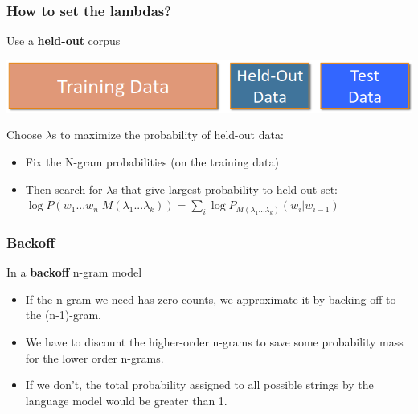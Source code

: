 \documentclass[13.5pt,aspecratio=169]{beamer}
\begin{document}

\begin{frame}
    \onehalfspacing
        \frametitle{How to set the lambdas?}
        {\Large Use a \textbf{held-out} corpus}
        \begin{minipage}{0.75\textwidth}
           \centering
           \includegraphics[scale=0.5]{held_out_corpus.png}
        \end{minipage}

        \vspace{3em}
        \begin{block}{Choose $\lambda$s to maximize the probability of held-out data:}
        \begin{itemize}
            \item Fix the N-gram probabilities (on the training data)
            \item Then search for $\lambda$s that give largest probability to held-out set: \\ \vspace{1em}
            \hspace{1.5em} $ \log{P(w_1 ... w_n | M(\lambda_1 ... \lambda_k))} = \sum_{i} \log{P_{M(\lambda_1 ... \lambda_k)} (w_i | w_{i-1})} $
        \end{itemize}
        \end{block}
    
       
    \end{frame}
    

\begin{frame}
    \onehalfspacing
        \frametitle{Backoff}
        \begin{block}{In a \textbf{backoff} n-gram model}
            \begin{itemize}
                \item If the n-gram we need has zero counts, we approximate it by backing off to the (n-1)-gram.
                \item We have to discount the higher-order n-grams to save some probability mass for the lower order n-grams.
                \item If we don’t, the total probability assigned to all possible strings by the language model would be greater than 1.
            \end{itemize}
        \end{block}
    
        
\end{frame}
\end{document}
